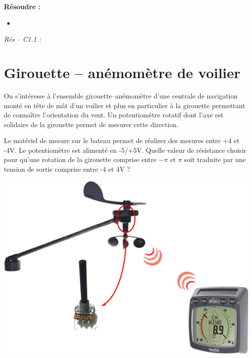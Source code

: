 \documentclass[10pt]{article}
\begin{document}






\begin{comp}
\noindent \textbf{Résoudre :} 
\begin{itemize}
\item 
\end{itemize}

\noindent \textit{Rés -- C1.1 :} 
\end{comp}

\section*{Girouette -- anémomètre de voilier}



\begin{minipage}[c]{.6\linewidth}
On s'intéresse à l'ensemble girouette--anémomètre d'une centrale de navigation monté en tête de mât d'un voilier et plus en particulier à la girouette permettant de connaître l'orientation du vent. Un potentiomètre rotatif dont l'axe est solidaire de la girouette permet de mesurer cette direction. 
\begin{obj}
Le matériel de mesure sur le bateau permet de réaliser des mesures entre +4 et -4V. Le potentiomètre est alimenté en -5/+5V. Quelle valeur de résistance choisir pour qu'une rotation de la girouette comprise entre $-\pi$ et $\pi$ soit traduite par une tension de sortie comprise entre -4 et 4V ?
\end{obj}

\end{minipage} \hfill
\begin{minipage}[c]{.35\linewidth}
\begin{center}
\includegraphics[width=\textwidth]{images/GirouetteAnemometre}
\end{center}
\end{minipage}
\end{document}
